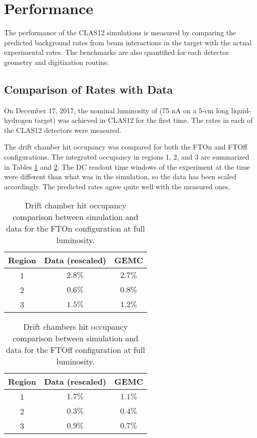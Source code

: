\section{Performance}

The performance of the CLAS12 simulations is measured by comparing the predicted background rates from beam interactions
in the target with the actual experimental rates. The benchmarks are also quantified for each detector geometry and digitization routine.

\subsection{Comparison of Rates with Data}
On December 17, 2017, the nominal luminosity of \cLuminosity
(75 nA on a 5-cm long liquid-hydrogen target) was achieved in CLAS12 for the first time.
The rates in each of the CLAS12 detectors were measured.

The drift chamber hit occupancy was compared for both the FTOn and FTOff configurations. The integrated occupancy
in regions 1, 2, and 3 are summarized in Tables \ref{tab:ftOnComparison} and \ref{tab:ftOffComparison}. The
DC readout time windows of the experiment at the time were different than what was in the simulation, so the data has been scaled
accordingly. The predicted rates agree quite well with the measured ones.

\begin{table}[h]
	\begin{center}
		\begin{tabular}{| c | c | c |}
			\hline \hline
			Region & Data (rescaled) &  GEMC \\
			\hline
			1 &  $2.8\%$  & $2.7\%$ \\
			2 &  $0.6\%$  & $0.8\%$ \\
			3 &  $1.5\%$  & $1.2\%$ \\
		\hline \hline
		\end{tabular}
	\end{center}
	\caption{Drift chamber hit occupancy comparison between simulation and data for the FTOn configuration at full luminosity.}\label{tab:ftOnComparison}
\end{table}

\begin{table}[h]
	\begin{center}
		\begin{tabular}{| c | c | c |}
			\hline \hline
			Region & Data (rescaled) &  GEMC \\
			\hline
			1 &  $1.7\%$  & $1.1\%$ \\
			2 &  $0.3\%$  & $0.4\%$ \\
			3 &  $0.9\%$  & $0.7\%$ \\
		\hline \hline
		\end{tabular}
	\end{center}
	\caption{Drift chambers hit occupancy comparison between simulation and data for the FTOff configuration at full luminosity.}\label{tab:ftOffComparison}
\end{table}


